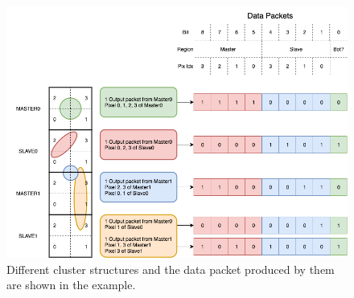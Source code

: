         \begin{figure}[h!]
            \centering
            \includegraphics[width=.9\linewidth]{figures/ARCADIA/clustering.png}
            \caption{Different cluster structures and the data packet produced by them are shown in the example.}
            \label{fig:clustering}
        \end{figure}

